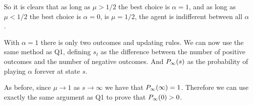 \documentclass{article}
\begin{document}
So it is clears that as long as $\mu > 1/2$ the best choice is $\alpha = 1$,
and as long as $\mu < 1/2$ the best choice is $\alpha = 0$, is $\mu = 1/2$,
the agent is indifferent between all $\alpha$.

With $\alpha = 1$ there is only two outcomes and updating rules. We can now use
the same method as Q1, defining $s_t$ as the difference between the number of
positive outcomes and the number of negative outcomes. And $P_{\infty}(s)$ as the probability
of playing $\alpha$ forever at state $s$.

As before, since $\mu \to 1$ as $s \to \infty$ we have that $P_{\infty}(\infty) = 1$.
Therefore we can use exactly the same argument as Q1 to prove that $P_{\infty}(0) > 0$.






\end{document}
